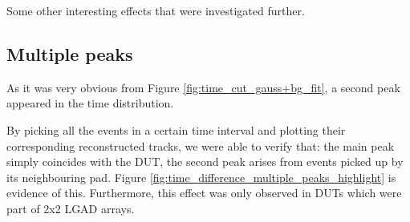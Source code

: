 Some other interesting effects that were investigated further.

\subsection{Multiple peaks}\label{sec:multiple_peaks}

As it was very obvious from Figure \ref{fig:time_cut_gauss+bg_fit}, a second peak appeared in the time distribution.

By picking all the events in a certain time interval and plotting their corresponding reconstructed tracks, we were able to verify that: the main peak simply coincides with the DUT, the second peak arises from events picked up by its neighbouring pad. Figure \ref{fig:time_difference_multiple_peaks_highlight} is evidence of this.
Furthermore, this effect was only observed in DUTs which were part of 2x2 LGAD arrays.

